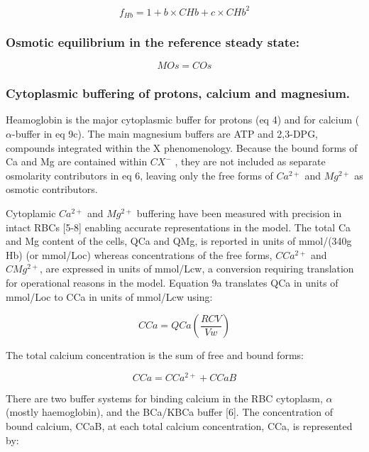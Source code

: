 \documentclass[a4paper]{article}
\newcommand{\med}[1]{M#1}
\newcommand{\cell}[1]{C#1}
\newcommand{\MOs}{\med{Os}}
\newcommand{\CMgtp}{\cell{Mg^{2+}}}
\newcommand{\CCatp}{\cell{Ca^{2+}}}
\newcommand{\CHb}{\cell{Hb}}
\newcommand{\COs}{\cell{Os}}
\newcommand{\CCa}{\cell{Ca}}
\newcommand{\CCaB}{\cell{CaB}}
\newcommand{\QCa}{QCa}
\newcommand{\fHb}{f_{Hb}}
\begin{document}
\begin{equation}
\fHb = 1 + b\times\CHb + c\times\CHb^2 
\end{equation}

\subsubsection{Osmotic equilibrium in the reference steady state:}

\begin{equation}
\MOs = \COs
\end{equation}

\subsubsection{Cytoplasmic buffering of protons, calcium and magnesium.}
Heamoglobin is the major cytoplasmic buffer for protons (eq 4) and for calcium ($\alpha$-buffer in eq 9c).  The main magnesium buffers are ATP and 2,3-DPG, compounds integrated within the X  phenomenology.  Because the bound forms of Ca and Mg are contained within $CX^-$ , they are not included as separate osmolarity contributors in eq 6, leaving only the free forms of $Ca^{2+}$ and $Mg^{2+}$ as osmotic contributors.  

Cytoplamic $Ca^{2+}$ and $Mg^{2+}$ buffering have been measured with precision in intact RBCs [5-8] enabling accurate representations in the model.  The total Ca and Mg content of the cells, QCa and QMg, is reported in units of mmol/(340g Hb) (or mmol/Loc) whereas concentrations of the free forms, $\CCatp$ and $\CMgtp$, are expressed in units of mmol/Lcw, a conversion requiring translation for operational reasons in the model. Equation 9a translates QCa in units of mmol/Loc to CCa in units of mmol/Lcw using:


\setcounter{equation}{0}
\renewcommand{\theequation}{9.\alph{equation}}

\begin{equation}
\CCa = \QCa\left(\frac{RCV}{Vw}\right)
\end{equation}
 

The total calcium concentration is the sum of free and bound forms:

\begin{equation}
\CCa = \CCatp + \CCaB
\end{equation}

There are two buffer systems for binding calcium in the RBC cytoplasm, $\alpha$ (mostly haemoglobin), and the BCa/KBCa buffer [6]. The concentration of bound calcium, CCaB, at each total calcium concentration, CCa, is represented by:
\end{document}
